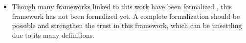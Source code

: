 \begin{itemize}
  \item Though many frameworks linked to this work have been formalized
        \cite{HssRevisited15,PresentableSignatures21,HssTypedUnimath22,FioreSzamozvancevPopl22,HssNonWellfounded24},
        this framework has not been formalized yet.
        A complete formalization should be possible and strengthen the trust in
        this framework, which can be unsettling due to its many definitions.
\end{itemize}



%
%
%
%
